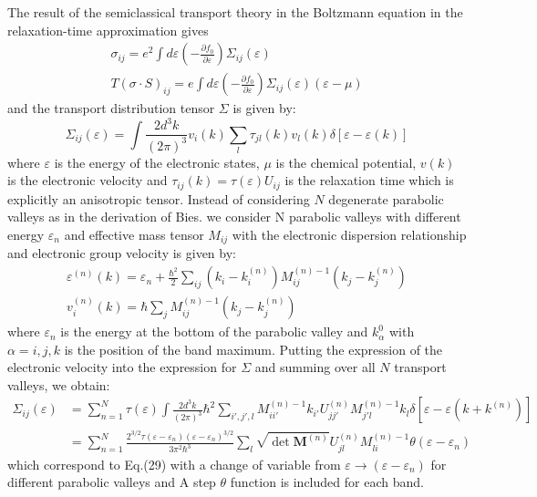 \documentclass{article}
\newcommand{\pfrac}[2]{\frac{\partial #1}{\partial #2}}
\begin{document}
The result of the semiclassical transport theory in the Boltzmann 
equation in the relaxation-time approximation gives
\begin{gather}
    \sigma_{ij} = e^2\int d\varepsilon \left( -\pfrac{f_0}{\varepsilon} \right) \Sigma_{ij}(\varepsilon) \\
    T(\sigma \cdot S)_{ij} = e\int d\varepsilon \left(-\pfrac{f_0}{\varepsilon}\right) 
                                \Sigma_{ij}(\varepsilon) (\varepsilon - \mu)     
\end{gather}
and the transport distribution tensor $\Sigma$ is given by:
\begin{equation}
    \Sigma_{ij}(\varepsilon) = \int \frac{2d^3k}{(2\pi)^3} v_i(k) \sum_l \tau_{jl}(k)v_l(k) \delta[\varepsilon - \varepsilon(k)]
\end{equation}
where $\varepsilon$ is the energy of the electronic states, $\mu$ is the chemical potential, 
$v(k)$ is the electronic velocity and $\tau_{ij}(k) = \tau(\varepsilon)U_{ij}$ 
is the relaxation time which is explicitly
an anisotropic tensor. 
Instead of considering $N$ degenerate parabolic valleys as in the derivation of Bies. 
we consider N parabolic valleys with different energy $\varepsilon_n$ and effective mass 
tensor $M_{ij}$ with the electronic dispersion relationship and 
electronic group velocity is given by:
\begin{gather}
    \varepsilon^{(n)}(k) = \varepsilon_n + 
        \frac{\hbar^2}{2} \sum_{ij} (k_i - k_i^{(n)}) M_{ij}^{(n)-1} (k_j - k_j^{(n)}) \\
    v_i^{(n)}(k) = \hbar\sum_j M_{ij}^{(n)-1} (k_j - k_j^{(n)})
\end{gather}
where $\varepsilon_n$ is the energy at the bottom of the parabolic valley and 
$k_{\alpha}^0$ with $\alpha = i,j,k$ is the position of the band maximum. 
Putting the expression of the electronic velocity into the expression for $\Sigma$
and summing over all $N$ transport valleys, we obtain:
\begin{align}
    \Sigma_{ij} (\varepsilon) & = \sum_{n=1}^N \tau(\varepsilon)
        \int \frac{2d^3k}{(2\pi)^3} \hbar^2 
        \sum_{i',j',l} M_{ii'}^{(n)-1} k_{i'} U_{jj'}^{(n)} M_{j'l}^{(n)-1} k_l 
        \delta[\varepsilon - \varepsilon(k + k^{(n)})] \\
        & = \sum_{n=1}^N  \frac{2^{3/2} \tau(\varepsilon - \varepsilon_n) (\varepsilon - \varepsilon_n)^{3/2} }{3\pi^2\hbar^3}
        \sum_l \sqrt{\det \mathbf{M}^{(n)}} U_{jl}^{(n)} M_{li}^{(n)-1} \theta(\varepsilon - \varepsilon_n)
\end{align}
which correspond to Eq.(29) with a change of variable from $\varepsilon \to (\varepsilon - \varepsilon_n)$ 
for different parabolic valleys and A step $\theta$ function is included for each band. 
\end{document}
